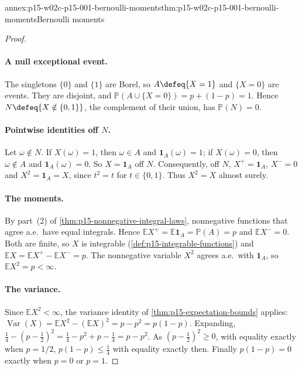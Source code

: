 \begin{annexitem}{annex:p15-w02c-p15-001-bernoulli-moments}{thm:p15-w02c-p15-001-bernoulli-moments}{Bernoulli moments}
\begin{proof}
\paragraph{A null exceptional event.}
The singletons \(\{0\}\) and \(\{1\}\) are Borel, so
\(A\defeq\{X=1\}\) and \(\{X=0\}\) are events. They are disjoint, and
\(\mathbb P(A\cup\{X=0\})=p+(1-p)=1\). Hence
\(N\defeq\{X\notin\{0,1\}\}\), the complement of their union, has
\(\mathbb P(N)=0\).

\paragraph{Pointwise identities off \(N\).}
Let \(\omega\notin N\). If \(X(\omega)=1\), then \(\omega\in A\) and
\(\mathbf1_A(\omega)=1\); if \(X(\omega)=0\), then \(\omega\notin A\)
and \(\mathbf1_A(\omega)=0\). So \(X=\mathbf1_A\) off \(N\). Consequently,
off \(N\), \(X^+=\mathbf1_A\), \(X^-=0\) and \(X^2=\mathbf1_A=X\), since
\(t^2=t\) for \(t\in\{0,1\}\). Thus \(X^2=X\) almost surely.

\paragraph{The moments.}
By part~(2) of \cref{thm:p15-nonnegative-integral-laws}, nonnegative
functions that agree a.e.\ have equal integrals. Hence
\(\mathbb EX^+=\mathbb E\mathbf1_A=\mathbb P(A)=p\) and
\(\mathbb EX^-=0\). Both are finite, so \(X\) is integrable
(\cref{def:p15-integrable-functions}) and
\(\mathbb EX=\mathbb EX^+-\mathbb EX^-=p\). The nonnegative variable
\(X^2\) agrees a.e.\ with \(\mathbf1_A\), so \(\mathbb EX^2=p<\infty\).

\paragraph{The variance.}
Since \(\mathbb EX^2<\infty\), the variance identity of
\cref{thm:p15-expectation-bounds} applies:
\(\operatorname{Var}(X)=\mathbb EX^2-(\mathbb EX)^2=p-p^2=p(1-p)\).
Expanding, \(\tfrac14-(p-\tfrac12)^2=\tfrac14-p^2+p-\tfrac14=p-p^2\).
As \((p-\tfrac12)^2\geq0\), with equality exactly when \(p=1/2\),
\(p(1-p)\leq\tfrac14\) with equality exactly then. Finally
\(p(1-p)=0\) exactly when \(p=0\) or \(p=1\).
\end{proof}
\end{annexitem}

